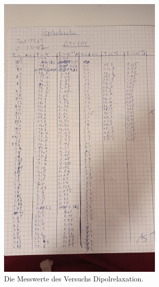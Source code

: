 \begin{figure}[h]
    \centering
    \includegraphics[width=0.7\textwidth]{latex/images/Messwerte_1.jpeg}
    \caption{Die Messwerte des Versuchs Dipolrelaxation.}
\end{figure}

